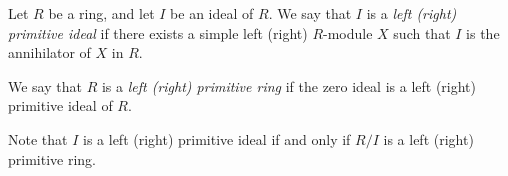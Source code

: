 \documentclass[12pt]{article}
\begin{document}
Let $R$ be a ring, and let $I$ be an ideal of $R$.
We say that $I$ is a {\it left (right) primitive ideal}
if there exists a simple left (right) $R$-module $X$
such that $I$ is the annihilator of $X$ in $R$.

We say that $R$ is a {\it left (right) primitive ring}
if the zero ideal is a left (right) primitive ideal of $R$.

Note that $I$ is a left (right) primitive ideal 
if and only if $R/I$ is a left (right) primitive ring.
\end{document}
